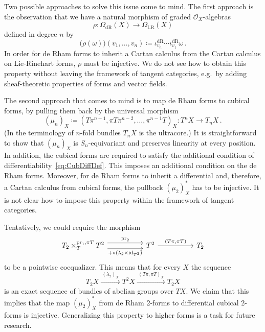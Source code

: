 \documentclass[12pt,reqno, a4paper]{amsart}
\numberwithin{equation}{section}
\theoremstyle{plain}
\theoremstyle{definition}
\theoremstyle{remark}
\newcommand{\calO}{\mathcal{O}}
\newcommand{\id}{\mathrm{id}}
\newcommand{\pr}{\mathrm{pr}}
\begin{document}
Two possible approaches to solve this issue come to mind. The first approach is the observation that we have a natural morphism of graded $\calO_X$-algebras
\begin{equation*}
  \rho:
  \Omega_\mathrm{dR}(X)
  \longrightarrow
  \Omega_\mathrm{LR}(X)
\end{equation*}
defined in degree $n$ by
\begin{equation}
  \bigl(\rho(\omega)\bigr)(v_1, \ldots, v_n)
  \coloneqq
  \iota^\mathrm{dR}_{v_n} \cdots \iota^\mathrm{dR}_{v_1} \omega
  \,.
\end{equation}
In order for de Rham forms to inherit a Cartan calculus from the Cartan calculus on Lie-Rinehart forms, $\rho$ must be injective. We do not see how to obtain this property without leaving the framework of tangent categories, e.g.~by adding sheaf-theoretic properties of forms and vector fields.

The second approach that comes to mind is to map de Rham forms to cubical forms, by pulling them back by the universal morphism
\begin{equation*}
  (\mu_n)_X \coloneqq (T\pi^{n-1}, \pi T \pi^{n-2}, \ldots, \pi^{n-1}T)_X:
  T^n X \longrightarrow T_n X
  \,.
\end{equation*}
(In the terminology of $n$-fold bundles $T_n X$ is the ultracore.) It is straightforward to show that $(\mu_n)_X$ is $S_n$-equivariant and preserves linearity at every position. In addition, the cubical forms are required to satisfy the additional condition of differentiability~\eqref{eq:CubDiffDef}. This imposes an additional condition on the de Rham forms. Moreover, for de Rham forms to inherit a differential and, therefore, a Cartan calculus from cubical forms, the pullback $(\mu_2)_X^*$ has to be injective. It is not clear how to impose this property within the framework of tangent categories.

Tentatively, we could require the morphism
\begin{equation*}
\begin{tikzcd}[column sep=5em]
T_2 \times_{T}^{\pr_1, \pi T} T^2
\ar[r, shift left=4pt, "\pr_2"]
\ar[r, shift right=4pt, "+ \circ (\lambda_2 \times \id_{T^2})"']
&
T^2
\ar[r, "{(T\pi, \pi T)}"]
&
T_2
\end{tikzcd}
\end{equation*}
to be a pointwise coequalizer. This means that for every $X$ the sequence
\begin{equation*}
  T_2 X \xrightarrow{~(\lambda_2)_X~}
  T^2 X \xrightarrow{~(T\pi, \pi T)_X~} T_2 X
\end{equation*}
is an exact sequence of bundles of abelian groups over $TX$. We claim that this implies that the map $(\mu_2)_X^*$ from de Rham 2-forms to differential cubical 2-forms is injective. Generalizing this property to higher forms is a task for future research.
\end{document}
